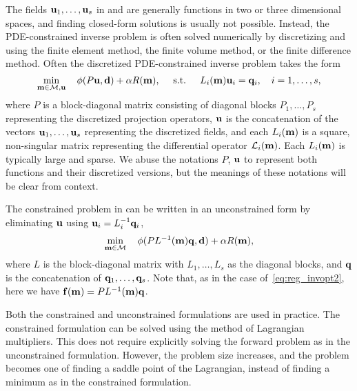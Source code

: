 The fields ${\bf u}_1, \ldots, {\bf u}_s$ in  and
 are generally functions in two or three dimensional spaces,
and finding closed-form solutions is usually not possible.
Instead, the PDE-constrained inverse problem is often solved numerically by
discretizing  and  using the finite
element method, the finite volume method, or the finite difference method.
Often the discretized PDE-constrained inverse problem takes the form
\begin{equation} \label{eq:discretized-constrained}
	\min_{{\bf m} \in {\cal M}, {\bf u}}\quad 
		\phi(P {\bf u}, {\bf d}) + \alpha R({\bf m}), \quad
			\text{ s.t. }\quad L_{i}({\bf m}) {\bf u}_{i} = {\bf q}_{i}, \quad i=1, \ldots, s,
\end{equation}
where $P$ is a block-diagonal matrix consisting of diagonal blocks 
$P_{1}, \ldots, P_{s}$ representing the discretized projection operators,
${\bf u}$ is the concatenation of the vectors ${\bf u}_1, \ldots, {\bf u}_s$ representing
the discretized fields,
and each $L_{i}({\bf m})$ is a square, non-singular matrix representing the
differential operator ${\cal L}_{i}({\bf m})$.
Each $L_{i}({\bf m})$ is typically large and sparse.
We abuse the notations $P$, ${\bf u}$ to represent both functions and their
discretized versions, but the meanings of these notations will be clear from
context.

The constrained problem in  can be written in
an unconstrained form by eliminating ${\bf u}$ using ${\bf u}_{i} = L_{i}^{-1} {\bf q}_{i}$,
\begin{equation} \label{eq:discretized-unconstrained}
	\min_{{\bf m} \in {\cal M}}\quad 
		\phi(P L^{-1}({\bf m}) {\bf q}, {\bf d}) + \alpha R({\bf m}), 
\end{equation}
where $L$ is the block-diagonal matrix with $L_1, \ldots, L_s$ as the diagonal
blocks, and ${\bf q}$ is the concatenation of ${\bf q}_1, \ldots, {\bf q}_s$. Note that, as in the case of~\eqref{eq:reg_invopt2}, here we have $ {\bf f}({\bf m}) = P L^{-1}({\bf m}) {\bf q} $.

Both the constrained and unconstrained formulations are used in practice.
The constrained formulation can be solved using the method of Lagrangian
multipliers.
This does not require explicitly solving the forward problem as in the
unconstrained formulation.
However, the problem size increases, and the problem becomes one of finding a
saddle point of the Lagrangian, instead of finding a minimum as in the
constrained formulation.

